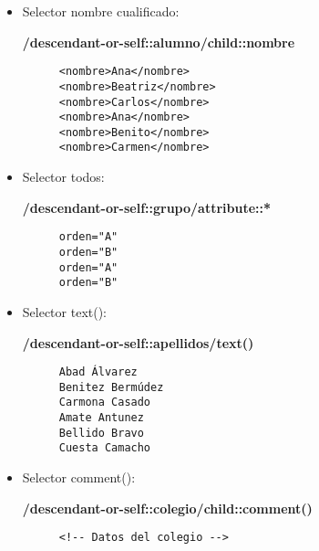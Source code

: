 \begin{itemize}
    \item Selector nombre cualificado:

    \textbf{/descendant-or-self::alumno/child::nombre}
    \begin{figure}[h]
        \begin{tcolorbox}[sharp corners, colback=yellow!30, colframe=white!20]
            \scriptsize
            \begin{verbatim}
<nombre>Ana</nombre>
<nombre>Beatriz</nombre>
<nombre>Carlos</nombre>
<nombre>Ana</nombre>
<nombre>Benito</nombre>
<nombre>Carmen</nombre>
            \end{verbatim}
        \end{tcolorbox}
    \end{figure}

    \item Selector todos:

    \textbf{ /descendant-or-self::grupo/attribute::*}
        \begin{figure}[h]
        \begin{tcolorbox}[sharp corners, colback=yellow!30, colframe=white!20]
            \scriptsize
            \begin{verbatim}
orden="A"
orden="B"
orden="A"
orden="B"
            \end{verbatim}
        \end{tcolorbox}
    \end{figure}

    \item Selector text():

    \textbf{/descendant-or-self::apellidos/text()}
    \begin{figure}[h]
    \begin{tcolorbox}[sharp corners, colback=yellow!30, colframe=white!20]
        \scriptsize
        \begin{verbatim}
Abad Álvarez
Benitez Bermúdez
Carmona Casado
Amate Antunez
Bellido Bravo
Cuesta Camacho
        \end{verbatim}
    \end{tcolorbox}
\end{figure}

    \item Selector comment():

    \textbf{ /descendant-or-self::colegio/child::comment()}
    \begin{figure}[H]
    \begin{tcolorbox}[sharp corners, colback=yellow!30, colframe=white!20]
        \scriptsize
        \begin{verbatim}
<!-- Datos del colegio -->
        \end{verbatim}
    \end{tcolorbox}
\end{figure}


\end{itemize}
